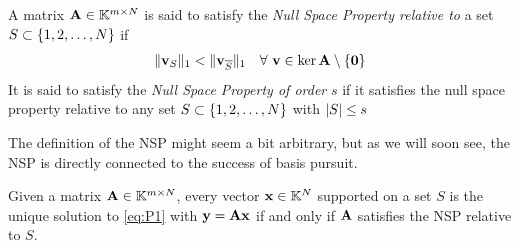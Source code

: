 \begin{definition} \label{def:NSP}
	A matrix $ \mathbf{A} \in \mathbb{K}^{m\times N} $ is said to satisfy the \textit{Null Space Property relative to} a set $ S \subset \{1, 2, \ldots, N\} $ if
	\[ 
		\lVert\mathbf{v}_S\rVert_1 < \lVert\mathbf{v}_{\overline{S}}\rVert_{1} \quad \forall ~ \mathbf{v} \in \ker \mathbf{A} \setminus \{\mathbf{0}\}
	\]
	It is said to satisfy the \textit{Null Space Property of order} $ s $ if it satisfies the null space property relative to any set $ S \subset \{1, 2, \ldots, N\} $ with $ \left|S\right| \leq s $
\end{definition}

The definition of the NSP might seem a bit arbitrary, but as we will soon see, the NSP is directly connected to the success of basis pursuit.

\begin{theorem}
	\label{thm:NSP_to_basis_special}
	Given a matrix $ \mathbf{A} \in \mathbb{K}^{m \times N} $, every vector $ \mathbf{x} \in \mathbb{K}^{N} $ supported on a set $ S $ is the unique solution to \eqref{eq:P1} with $ \mathbf{y} = \mathbf{A}\mathbf{x} $ if and only if $ \mathbf{A} $ satisfies the NSP relative to $ S $. 
\end{theorem}

